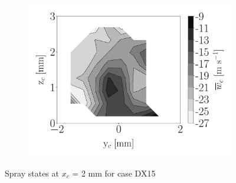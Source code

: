 \begin{figure}[h!]
\begin{subfigure}[b]{0.3\textwidth}
	\centering
   \includegraphics[scale=\scaleSLIBIMER]{./part3_applications/figures_ch8_resolved/injectors_SLI/dx15_xD06p67_uz_mean_map}
\end{subfigure}
\caption{Spray states at $x_c$ = 2 mm for case DX15}
\label{fig:injectors_sli_BIMER_DX15_xD06p67}
\end{figure}
